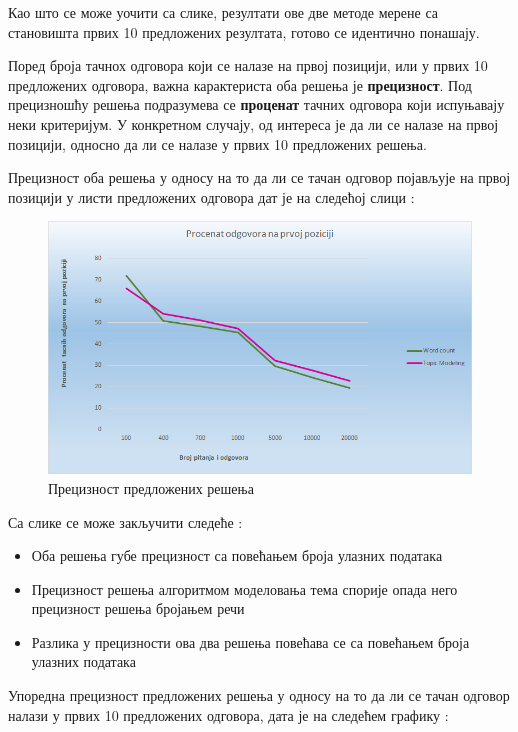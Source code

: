 Као што се може уочити са слике, резултати ове две методе мерене са становишта првих 10 предложених резултата, готово се идентично понашају. 



Поред броја тачнох одговора који се налазе на првој позицији, или у првих 10 предложених одговора, важна карактериста оба решења је \textbf{прецизност}. Под прецизношћу решења подразумева се \textbf{проценат} тачних одговора који испуњавају неки критеријум. У конкретном случају, од интереса је да ли се налазе на првој позицији, односно да ли се налазе у првих 10 предложених решења.

Прецизност оба решења у односу на то да ли се тачан одговор појављује на првој позицији у листи предложених одговора дат је на следећој слици :

\begin{figure}[H]
  \centering
   \includegraphics[scale=0.8]{./Slike/procenatPrva.png} 
	\caption{Прецизност предложених решења}
	\label{fig:slika1}
\end{figure}

Са слике се може закључити следеће :
\begin{itemize}
\item Оба решења губе прецизност са повећањем броја улазних података
\item Прецизност решења алгоритмом моделовања тема спорије опада него прецизност решења бројањем речи
\item Разлика у прецизности ова два решења повећава се са повећањем броја улазних података
\end{itemize}

Упоредна прецизност предложених решења у односу на то да ли се тачан одговор налази у првих 10 предложених одговора, дата је на следећем графику :

